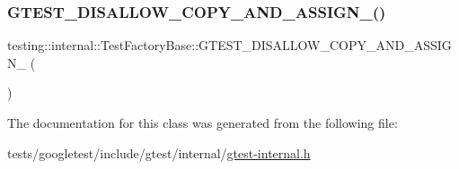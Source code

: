\subsubsection{\texorpdfstring{G\+T\+E\+S\+T\+\_\+\+D\+I\+S\+A\+L\+L\+O\+W\+\_\+\+C\+O\+P\+Y\+\_\+\+A\+N\+D\+\_\+\+A\+S\+S\+I\+G\+N\+\_\+()}{GTEST\_DISALLOW\_COPY\_AND\_ASSIGN\_()}}
{\footnotesize\ttfamily testing\+::internal\+::\+Test\+Factory\+Base\+::\+G\+T\+E\+S\+T\+\_\+\+D\+I\+S\+A\+L\+L\+O\+W\+\_\+\+C\+O\+P\+Y\+\_\+\+A\+N\+D\+\_\+\+A\+S\+S\+I\+G\+N\+\_\+ (\begin{DoxyParamCaption}\item[{\hyperlink{classtesting_1_1internal_1_1TestFactoryBase}{Test\+Factory\+Base}}]{ }\end{DoxyParamCaption})\hspace{0.3cm}{\ttfamily [private]}}



The documentation for this class was generated from the following file\+:\begin{DoxyCompactItemize}
\item 
tests/googletest/include/gtest/internal/\hyperlink{gtest-internal_8h}{gtest-\/internal.\+h}\end{DoxyCompactItemize}
